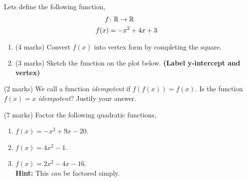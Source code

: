 \documentclass[12pt]{article} %
\begin{document}
\newpage

\begin{qstn}
 Lets define the following function,
  \begin{align*}
    f &\colon \mathbb R \to \mathbb R\\
    f(x) &= -x^2 + 4x + 3
  \end{align*}
  \begin{enumerate}[label=(\alph*)]
    \item (4 marks) Convert $f(x)$ into vertex form by completing the square.
      \vspace*{6cm}


    \item (3 marks) Sketch the function on the plot below. \textbf{(Label y-intercept and vertex)}
    \begin{center}
    \end{center}
  \end{enumerate}
\end{qstn}

\begin{qstn}
  (2 marks) We call a function \emph{idempotent} if $f(f(x)) = f(x)$. Is the function \\
  $f(x) = x$ \emph{idempotent}? Justify your answer.
\end{qstn}
\vspace*{4cm}

\begin{qstn}
  (7 marks) Factor the following quadratic functions,
  \begin{enumerate}[label=(\alph*)]
    \item $f\left( x \right) = -x ^2 +9x -20$.
      \vspace*{5cm}

    \item $f(x) = 4x^2 - 1$.
      \vspace*{5cm}

    \item $f\left( x \right) = 2x^2 - 4x - 16$.\\
      \textbf{Hint:} This \emph{can} be factored simply.
  \end{enumerate}
\end{qstn}
\end{document}
